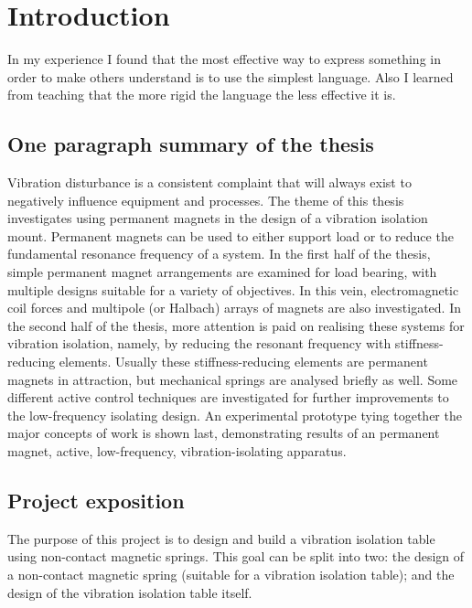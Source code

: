 
\chapter{Introduction}

\epigraph{In my experience I found that the most effective way to express
something in order to make others understand is to use the simplest language.
Also I learned from teaching that the more rigid the language the less
effective it is.}{\textcite{mahathera1990}}

\section{One paragraph summary of the thesis}

Vibration disturbance is a consistent complaint that will always exist to
negatively influence equipment and processes. The theme of this thesis
investigates using permanent magnets in the design of a vibration isolation
mount. Permanent magnets can be used to either support load or to reduce the
fundamental resonance frequency of a system. In the first half of the thesis,
simple permanent magnet arrangements are examined for load bearing, with
multiple designs suitable for a variety of objectives. In this vein,
electromagnetic coil forces and multipole (or Halbach) arrays of magnets are
also investigated. In the second half of the thesis, more attention is paid on
realising these systems for vibration isolation, namely, by reducing the
resonant frequency with stiffness-reducing elements. Usually these
stiffness-reducing elements are permanent magnets in attraction, but
mechanical springs are analysed briefly as well. Some different active control
techniques are investigated for further improvements to the low-frequency
isolating design. An experimental prototype tying together the major concepts
of work is shown last, demonstrating results of an permanent magnet, active,
low-frequency, vibration-isolating apparatus.

\section{Project exposition}

The purpose of this project is to design and build a vibration
isolation table using non-contact magnetic springs. This goal can be
split into two: the design of a non-contact magnetic spring (suitable
for a vibration isolation table); and the design of the vibration
isolation table itself.

